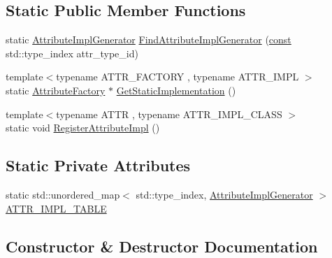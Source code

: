 \subsection*{Static Public Member Functions}
\begin{DoxyCompactItemize}
\item 
static \mbox{\hyperlink{namespacelucene_1_1core_1_1util_acbd8821be7d7b29749374e57b0a7c40b}{Attribute\+Impl\+Generator}} \mbox{\hyperlink{classlucene_1_1core_1_1util_1_1AttributeFactory_af56838e41c83a10b00063e02c3f910e6}{Find\+Attribute\+Impl\+Generator}} (\mbox{\hyperlink{ZlibCrc32_8h_a2c212835823e3c54a8ab6d95c652660e}{const}} std\+::type\+\_\+index attr\+\_\+type\+\_\+id)
\item 
{\footnotesize template$<$typename A\+T\+T\+R\+\_\+\+F\+A\+C\+T\+O\+RY , typename A\+T\+T\+R\+\_\+\+I\+M\+PL $>$ }\\static \mbox{\hyperlink{classlucene_1_1core_1_1util_1_1AttributeFactory}{Attribute\+Factory}} $\ast$ \mbox{\hyperlink{classlucene_1_1core_1_1util_1_1AttributeFactory_ac770bcd808b70e6d1d5f8a3c6cd8150d}{Get\+Static\+Implementation}} ()
\item 
{\footnotesize template$<$typename A\+T\+TR , typename A\+T\+T\+R\+\_\+\+I\+M\+P\+L\+\_\+\+C\+L\+A\+SS $>$ }\\static void \mbox{\hyperlink{classlucene_1_1core_1_1util_1_1AttributeFactory_a57d5469dd678591652d59bf3db4890e1}{Register\+Attribute\+Impl}} ()
\end{DoxyCompactItemize}
\subsection*{Static Private Attributes}
\begin{DoxyCompactItemize}
\item 
static std\+::unordered\+\_\+map$<$ std\+::type\+\_\+index, \mbox{\hyperlink{namespacelucene_1_1core_1_1util_acbd8821be7d7b29749374e57b0a7c40b}{Attribute\+Impl\+Generator}} $>$ \mbox{\hyperlink{classlucene_1_1core_1_1util_1_1AttributeFactory_a5247e47d95ce30862a15e66ce2266d04}{A\+T\+T\+R\+\_\+\+I\+M\+P\+L\+\_\+\+T\+A\+B\+LE}}
\end{DoxyCompactItemize}


\subsection{Constructor \& Destructor Documentation}
\mbox{\label{classlucene_1_1core_1_1util_1_1AttributeFactory_a55d388271f308e3105344163e56dddc4}} 
